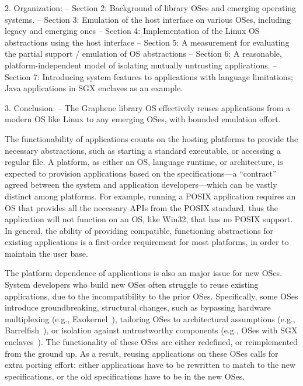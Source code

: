 \begin{outline}
2. Organization:
-- Section 2: Background of library OSes and emerging operating systems. 
-- Section 3: Emulation of the host interface on various OSes, including legacy and emerging ones
-- Section 4: Implementation of the Linux OS abstractions using the host interface
-- Section 5: A measurement for evaluating the partial support / emulation of OS abstractions
-- Section 6: A reasonable, platform-independent model of isolating mutually untrusting applications.
-- Section 7: Introducing system features to applications with language limitations; Java applications in SGX enclaves as an example.

3. Conclusion:
-- The Graphene library OS effectively reuses applications from a modern OS like Linux to any emerging OSes, with bounded emulation effort. 

\end{outline}

The functionability of applications counts on the hosting platforms
to provide the necessary abstractions,
such as starting a standard executable, or accessing a regular file.
A platform, as either an OS, language runtime, or architecture, is expected to provision applications
based on the specifications---a ``contract'' agreed between the system and application developers---which can be vastly distinct among platforms.
For example, running a POSIX application
requires an OS that provides all the necessary APIs from the POSIX standard,
thus the application will not function
on an OS, like Win32, that has no POSIX support.
In general, the ability of providing compatible, functioning abstractions for existing applications
is a first-order requirement for most platforms,
in order to maintain the user base.

The platform dependence of applications is also an major issue for new OSes.
System developers who build new OSes often struggle to reuse existing applications,
due to the incompatibility to the prior OSes.
Specifically, some OSes introduce groundbreaking, structural changes, such as
bypassing hardware multiplexing (e.g., Exokernel~\citep{engler95exokernel}),
tailoring OSes to architectural assumptions (e.g., Barrelfish~\citep{baumann09barrelfish}),
or isolation against untrustworthy components (e.g., OSes with SGX enclaves~\citep{intelsgx}).
The functionality of these OSes are either redefined, or reimplemented from the ground up.
As a result, reusing applications on these OSes
calls for extra porting effort:
either applications have to be rewritten to match to the new specifications,
or the old specifications have to be  in the new OSes.


